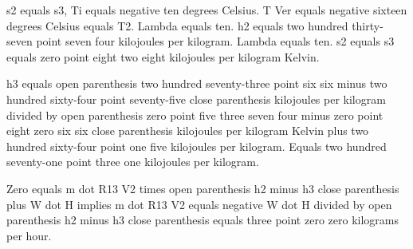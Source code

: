s2 equals s3, Ti equals negative ten degrees Celsius.
T Ver equals negative sixteen degrees Celsius equals T2.
Lambda equals ten.
h2 equals two hundred thirty-seven point seven four kilojoules per kilogram.
Lambda equals ten.
s2 equals s3 equals zero point eight two eight kilojoules per kilogram Kelvin.

h3 equals open parenthesis two hundred seventy-three point six six minus two hundred sixty-four point seventy-five close parenthesis kilojoules per kilogram divided by open parenthesis zero point five three seven four minus zero point eight zero six six close parenthesis kilojoules per kilogram Kelvin plus two hundred sixty-four point one five kilojoules per kilogram.
Equals two hundred seventy-one point three one kilojoules per kilogram.

Zero equals m dot R13 V2 times open parenthesis h2 minus h3 close parenthesis plus W dot H implies m dot R13 V2 equals negative W dot H divided by open parenthesis h2 minus h3 close parenthesis equals three point zero zero kilograms per hour.